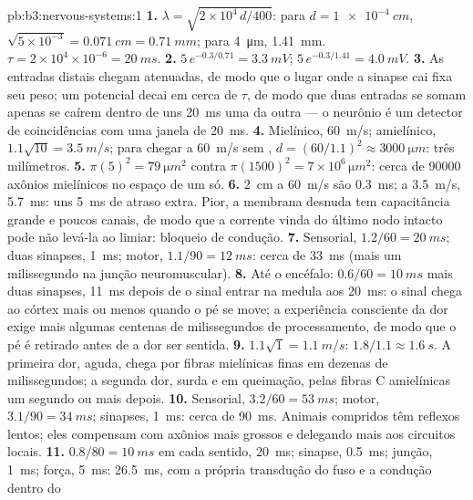 \begin{solution}{pb:b3:nervous-systems:1}
\textbf{1.} $\lambda = \sqrt{2\times 10^{4}\,d/400}$: para $d =
\qty{1e-4}{cm}$, $\sqrt{5\times 10^{-3}} = \qty{0.071}{cm} =
\qty{0.71}{mm}$; para \qty{4}{\micro m}, \qty{1.41}{mm}. $\tau = 2\times
10^{4}\times 10^{-6} = \qty{20}{ms}$.
\textbf{2.} $5\,e^{-0.3/0.71} = \qty{3.3}{mV}$; $5\,e^{-0.3/1.41} =
\qty{4.0}{mV}$.
\textbf{3.} As entradas distais chegam atenuadas, de modo que o lugar
onde a sinapse cai fixa seu peso; um potencial decai em cerca de $\tau$,
de modo que duas entradas se somam apenas se caírem dentro de uns
\qty{20}{ms} uma da outra --- o neurônio é um detector de coincidências
com uma janela de \qty{20}{ms}.
\textbf{4.} Mielínico, \qty{60}{m/s}; amielínico, $1.1\sqrt{10} =
\qty{3.5}{m/s}$; para chegar a \qty{60}{m/s} sem , $d = (60/1.1)^{2}
\approx \qty{3000}{\micro m}$: três milímetros.
\textbf{5.} $\pi(5)^{2} = \qty{79}{\micro m^2}$ contra $\pi(1500)^{2} =
7\times 10^{6}\,\unit{\micro m^2}$: cerca de \num{90000} axônios
mielínicos no espaço de um só.
\textbf{6.} \qty{2}{cm} a \qty{60}{m/s} são \qty{0.3}{ms}; a
\qty{3.5}{m/s}, \qty{5.7}{ms}: uns \qty{5}{ms} de atraso extra. Pior, a
membrana desnuda tem capacitância grande e poucos canais, de modo que a
corrente vinda do último nodo intacto pode não levá-la ao limiar:
bloqueio de condução.
\textbf{7.} Sensorial, $1.2/60 = \qty{20}{ms}$; duas sinapses,
\qty{1}{ms}; motor, $1.1/90 = \qty{12}{ms}$: cerca de \qty{33}{ms} (mais
um milissegundo na junção neuromuscular).
\textbf{8.} Até o encéfalo: $0.6/60 = \qty{10}{ms}$ mais duas sinapses,
\qty{11}{ms} depois de o sinal entrar na medula aos \qty{20}{ms}: o
sinal chega ao córtex mais ou menos quando o pé se move; a experiência
consciente da dor exige mais algumas centenas de milissegundos de
processamento, de modo que o pé é retirado antes de a dor ser sentida.
\textbf{9.} $1.1\sqrt{1} = \qty{1.1}{m/s}$: $1.8/1.1 \approx
\qty{1.6}{s}$. A primeira dor, aguda, chega por fibras mielínicas finas
em dezenas de milissegundos; a segunda dor, surda e em queimação, pelas
fibras C amielínicas um segundo ou mais depois.
\textbf{10.} Sensorial, $3.2/60 = \qty{53}{ms}$; motor, $3.1/90 =
\qty{34}{ms}$; sinapses, \qty{1}{ms}: cerca de \qty{90}{ms}. Animais
compridos têm reflexos lentos; eles compensam com axônios mais grossos e
delegando mais aos circuitos locais.
\textbf{11.} $0.8/80 = \qty{10}{ms}$ em cada sentido, \qty{20}{ms};
sinapse, \qty{0.5}{ms}; junção, \qty{1}{ms}; força, \qty{5}{ms}:
\qty{26.5}{ms}, com a própria transdução do fuso e a condução dentro do

\end{solution}
